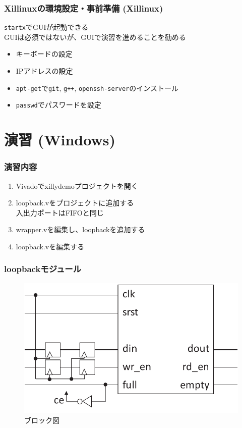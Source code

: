 ﻿\documentclass[dvipdfmx]{beamer}
\begin{document}
\begin{frame}[fragile]
	\frametitle{Xillinuxの環境設定・事前準備 (Xillinux)}
	\verb|startx|でGUIが起動できる\\
	GUIは必須ではないが、GUIで演習を進めることを勧める

	\begin{itemize}
		\item
			キーボードの設定
			\vfill
		\item
			IPアドレスの設定
			\vfill
		\item
			\verb|apt-get|で\verb|git|, \verb|g++|,
			\verb|openssh-server|のインストール
			\vfill
		\item
			\verb|passwd|でパスワードを設定
	\end{itemize}
\end{frame}

\section{演習 (Windows)}
\begin{frame}
	\frametitle{演習内容}
	\begin{enumerate}
		\item
			Vivadoでxillydemoプロジェクトを開く
			\vfill
		\item
			loopback.vをプロジェクトに追加する\\
			入出力ポートはFIFOと同じ
			\vfill
		\item
			wrapper.vを編集し、loopbackを追加する
			\vfill
		\item
			loopback.vを編集する
	\end{enumerate}
\end{frame}

\begin{frame}
	\frametitle{loopbackモジュール}
	\begin{figure}[ht]
		\centering
		\includegraphics[width=0.8\linewidth]{../img/loopback.pdf}
		\caption{ブロック図}
		\label{img:loopback}
	\end{figure}
\end{frame}
\end{document}
